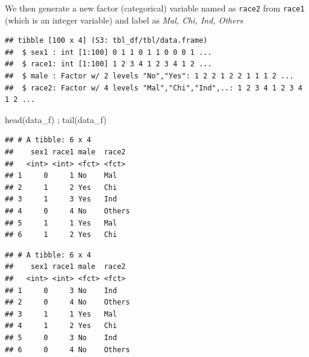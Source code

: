 \documentclass[
]{book}
\makeatletter
\newenvironment{Shaded}{\begin{snugshade}}{\end{snugshade}}
\newcommand{\AttributeTok}[1]{\textcolor[rgb]{0.61,0.61,0.61}{#1}}
\newcommand{\FunctionTok}[1]{\textcolor[rgb]{0,0,0}{#1}}
\newcommand{\NormalTok}[1]{#1}
\newcommand{\OtherTok}[1]{\textcolor[rgb]{0.37,0.37,0.37}{#1}}
\newcommand{\SpecialCharTok}[1]{\textcolor[rgb]{0,0,0}{#1}}
\newcommand{\StringTok}[1]{\textcolor[rgb]{0.5,0.5,0.5}{#1}}
\newenvironment{kframe}{%
\medskip{}
\setlength{\fboxsep}{.8em}
 \def\at@end@of@kframe{}%
 \ifinner\ifhmode%
  \def\at@end@of@kframe{\end{minipage}}%
  \begin{minipage}{\columnwidth}%
 \fi\fi%
 \def\FrameCommand##1{\hskip\@totalleftmargin \hskip-\fboxsep
 \colorbox{shadecolor}{##1}\hskip-\fboxsep
     \hskip-\linewidth \hskip-\@totalleftmargin \hskip\columnwidth}%
 \MakeFramed {\advance\hsize-\width
   \@totalleftmargin\z@ \linewidth\hsize
   \@setminipage}}%
 {\par\unskip\endMakeFramed%
 \at@end@of@kframe}
\renewenvironment{Shaded}{\begin{kframe}}{\end{kframe}}
\makeatother
\begin{document}
We then generate a new factor (categorical) variable named as \texttt{race2} from \texttt{race1} (which is an integer variable) and label as \emph{Mal, Chi, Ind, Others}

\begin{Shaded}
\end{Shaded}

\begin{verbatim}
## tibble [100 x 4] (S3: tbl_df/tbl/data.frame)
##  $ sex1 : int [1:100] 0 1 1 0 1 1 0 0 0 1 ...
##  $ race1: int [1:100] 1 2 3 4 1 2 3 4 1 2 ...
##  $ male : Factor w/ 2 levels "No","Yes": 1 2 2 1 2 2 1 1 1 2 ...
##  $ race2: Factor w/ 4 levels "Mal","Chi","Ind",..: 1 2 3 4 1 2 3 4 1 2 ...
\end{verbatim}

\begin{Shaded}
\begin{Highlighting}[]
\FunctionTok{head}\NormalTok{(data\_f) ; }\FunctionTok{tail}\NormalTok{(data\_f)}
\end{Highlighting}
\end{Shaded}

\begin{verbatim}
## # A tibble: 6 x 4
##    sex1 race1 male  race2 
##   <int> <int> <fct> <fct> 
## 1     0     1 No    Mal   
## 2     1     2 Yes   Chi   
## 3     1     3 Yes   Ind   
## 4     0     4 No    Others
## 5     1     1 Yes   Mal   
## 6     1     2 Yes   Chi
\end{verbatim}

\begin{verbatim}
## # A tibble: 6 x 4
##    sex1 race1 male  race2 
##   <int> <int> <fct> <fct> 
## 1     0     3 No    Ind   
## 2     0     4 No    Others
## 3     1     1 Yes   Mal   
## 4     1     2 Yes   Chi   
## 5     0     3 No    Ind   
## 6     0     4 No    Others
\end{verbatim}
\end{document}
